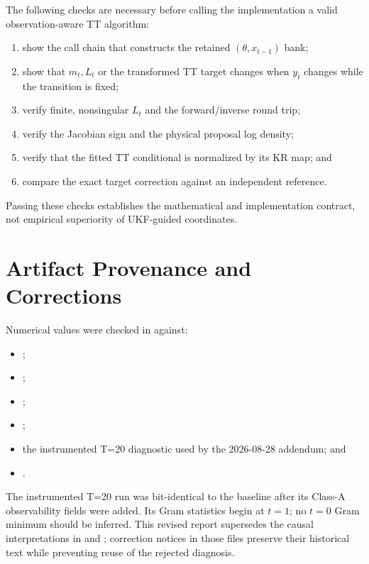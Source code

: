 \documentclass[11pt]{article}
\begin{document}
The following checks are necessary before calling the implementation a valid
observation-aware TT algorithm:
\begin{enumerate}
\item show the call chain that constructs the retained $(\theta,x_{t-1})$
      bank;
\item show that $m_t,L_t$ or the transformed TT target changes when $y_t$
      changes while the transition is fixed;
\item verify finite, nonsingular $L_t$ and the forward/inverse round trip;
\item verify the Jacobian sign and the physical proposal log density;
\item verify that the fitted TT conditional is normalized by its KR map; and
\item compare the exact target correction against an independent reference.
\end{enumerate}
Passing these checks establishes the mathematical and implementation contract,
not empirical superiority of UKF-guided coordinates.

\appendix
\section{Artifact Provenance and Corrections}

Numerical values were checked in
 against:
\begin{itemize}
\item {};
\item {};
\item {};
\item {};
\item the instrumented T=20 diagnostic used by the 2026-08-28 addendum; and
\item {}.
\end{itemize}

The instrumented T=20 run was bit-identical to the baseline after its Class-A
observability fields were added. Its Gram statistics begin at $t=1$; no $t=0$
Gram minimum should be inferred. This revised report supersedes the causal
interpretations in  and
; correction notices in
those files preserve their historical text while preventing reuse of the
rejected diagnosis.
\end{document}
